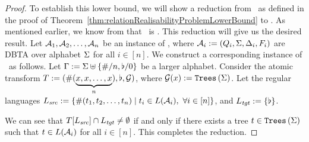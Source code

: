 \begin{proof}
    To establish this lower bound, we will show a reduction from \intersectionNonemptinessFull\ as defined in the proof of Theorem~\ref{thm:relationRealisabilityProblemLowerBound} to \atomicTypecheckingProblemFull. As mentioned earlier, we know from \cite{tata} that \intersectionNonemptinessFull\ is \exptc. This reduction will give us the desired result. Let $\mathcal{A}_1, \mathcal{A}_2 , \dots, \mathcal{A}_n$ be an instance of \intersectionNonemptinessFull, where $\mathcal{A}_i := (Q_i, \Sigma, \Delta_i, F_i)$ are DBTA over alphabet $\Sigma$ for all $i \in [n]$. We construct a corresponding instance of \atomicTypecheckingProblemFull\ as follows. Let $\Gamma := \Sigma \uplus \left\{ \#/n, \flat/0 \right\}$ be a larger alphabet. Consider the atomic transform $T := (\#(\underbrace{x, x, \dots, x}_n), \flat, \mathcal{G})$, where $\mathcal{G}(x) := \texttt{Trees}\left(\Sigma\right)$. Let the regular languages $L_{\mathit{src}} := \left\{ \#(t_1, t_2, \dots, t_n) \mid t_i \in L(\mathcal{A}_i),~\forall i \in [n] \right\}$, and $L_{\mathit{tgt}} := \left\{ \flat \right\}$.

    We can see that $T[L_{\mathit{src}}] \cap L_{\mathit{tgt}} \neq \emptyset$ if and only if there exists a tree $t \in \texttt{Trees}\left(\Sigma\right)$ such that $t \in L(\mathcal{A}_i)$ for all $i \in [n]$. This completes the reduction.
\end{proof}